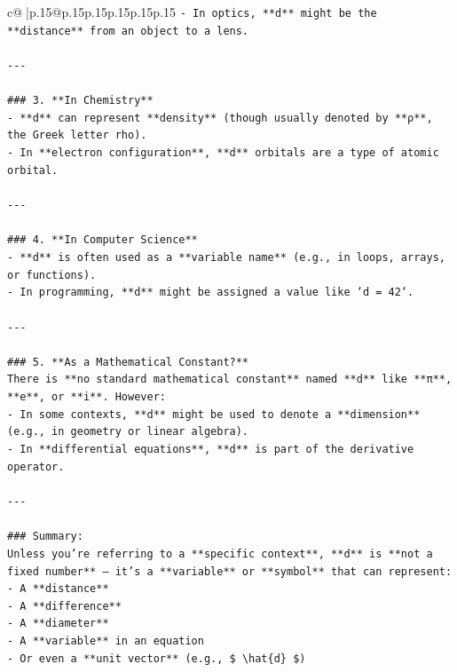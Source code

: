 \documentclass{article}
\begin{document}
{\begin{supertabular}{c@{$\;$}|p{.15\linewidth}@{}p{.15\linewidth}p{.15\linewidth}p{.15\linewidth}p{.15\linewidth}p{.15\linewidth}}
{{{\texttt{{-} In optics, **d** might be the **distance** from an object to a lens.} \\
\\ 
\texttt{{-}{-}{-}} \\
\\ 
\texttt{\#\#\# 3. **In Chemistry**} \\
\texttt{{-} **d** can represent **density** (though usually denoted by **ρ**, the Greek letter rho).} \\
\texttt{{-} In **electron configuration**, **d** orbitals are a type of atomic orbital.} \\
\\ 
\texttt{{-}{-}{-}} \\
\\ 
\texttt{\#\#\# 4. **In Computer Science**} \\
\texttt{{-} **d** is often used as a **variable name** (e.g., in loops, arrays, or functions).} \\
\texttt{{-} In programming, **d** might be assigned a value like `d = 42`.} \\
\\ 
\texttt{{-}{-}{-}} \\
\\ 
\texttt{\#\#\# 5. **As a Mathematical Constant?**} \\
\texttt{There is **no standard mathematical constant** named **d** like **π**, **e**, or **i**. However:} \\
\texttt{{-} In some contexts, **d** might be used to denote a **dimension** (e.g., in geometry or linear algebra).} \\
\texttt{{-} In **differential equations**, **d** is part of the derivative operator.} \\
\\ 
\texttt{{-}{-}{-}} \\
\\ 
\texttt{\#\#\# Summary:} \\
\texttt{Unless you're referring to a **specific context**, **d** is **not a fixed number** — it's a **variable** or **symbol** that can represent:} \\
\texttt{{-} A **distance**} \\
\texttt{{-} A **difference**} \\
\texttt{{-} A **diameter**} \\
\texttt{{-} A **variable** in an equation} \\
\texttt{{-} Or even a **unit vector** (e.g., \$ \textbackslash{}hat\{d\} \$)} \\
}}}
\end{supertabular}}
\end{document}
